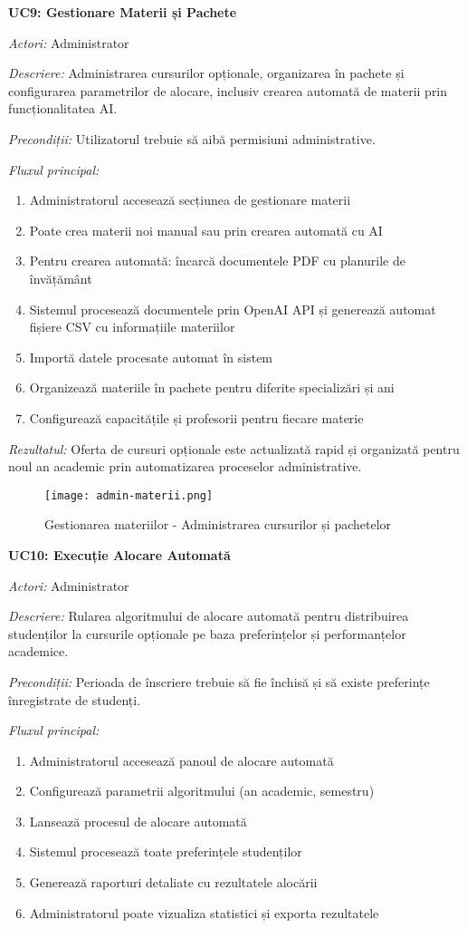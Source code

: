 \documentclass[12pt,a4paper]{report}
\begin{document}
\textbf{UC9: Gestionare Materii și Pachete}

\textit{Actori:} Administrator

\textit{Descriere:} Administrarea cursurilor opționale, organizarea în pachete și configurarea parametrilor de alocare, inclusiv crearea automată de materii prin funcționalitatea AI.

\textit{Precondiții:} Utilizatorul trebuie să aibă permisiuni administrative.

\textit{Fluxul principal:}
\begin{enumerate}
\item Administratorul accesează secțiunea de gestionare materii
\item Poate crea materii noi manual sau prin crearea automată cu AI
\item Pentru crearea automată: încarcă documentele PDF cu planurile de învățământ
\item Sistemul procesează documentele prin OpenAI API și generează automat fișiere CSV cu informațiile materiilor
\item Importă datele procesate automat în sistem
\item Organizează materiile în pachete pentru diferite specializări și ani
\item Configurează capacitățile și profesorii pentru fiecare materie
\end{enumerate}

\textit{Rezultatul:} Oferta de cursuri opționale este actualizată rapid și organizată pentru noul an academic prin automatizarea proceselor administrative.

\begin{figure}[H]
\centering
\texttt{[image: admin-materii.png]}
\caption{Gestionarea materiilor - Administrarea cursurilor și pachetelor}
\label{fig:admin-materii}
\end{figure}

\textbf{UC10: Execuție Alocare Automată}

\textit{Actori:} Administrator

\textit{Descriere:} Rularea algoritmului de alocare automată pentru distribuirea studenților la cursurile opționale pe baza preferințelor și performanțelor academice.

\textit{Precondiții:} Perioada de înscriere trebuie să fie închisă și să existe preferințe înregistrate de studenți.

\textit{Fluxul principal:}
\begin{enumerate}
\item Administratorul accesează panoul de alocare automată
\item Configurează parametrii algoritmului (an academic, semestru)
\item Lansează procesul de alocare automată
\item Sistemul procesează toate preferințele studenților
\item Generează raporturi detaliate cu rezultatele alocării
\item Administratorul poate vizualiza statistici și exporta rezultatele
\end{enumerate}
\end{document}
